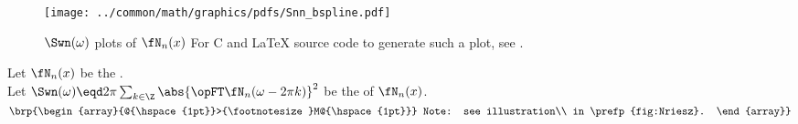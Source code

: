\begin{figure}
  \centering%
  \texttt{[image: ../common/math/graphics/pdfs/Snn\_bspline.pdf]}
  \caption{
     $\Swn(\omega)$ plots of  $\fN_n(x)$ 
    For C and {\LaTeX} source code to generate such a plot, see .
    \label{fig:Nriesz}
    }
\end{figure}
\begin{lemma}
\label{lem:Nriesz}
Let $\fN_n(x)$ be the  .\\
Let $\Swn(\omega)\eqd 2\pi\sum_{k\in\Z}\abs{\opFT\fN_n(\omega-2\pi k)}^2$ 
be the   of $\fN_n(x)$.
\hfill
$\brp{\begin{array}{@{\hspace{1pt}}>{\footnotesize}M@{\hspace{1pt}}}
  Note: see illustration\\
  in \prefp{fig:Nriesz}.
\end{array}}$
\end{lemma}
